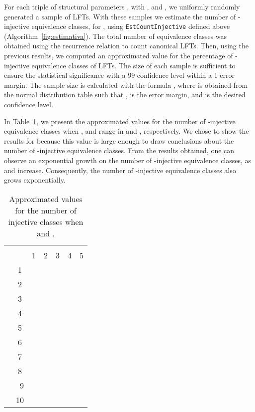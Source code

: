 \documentclass{ocg}
\newcommand{\LFT}{LFT}
\begin{document}
For each triple of structural parameters , with ,  and , we uniformly randomly
generated a sample of  \LFT{}s. With these samples we estimate
the number of -injective equivalence classes, for , using \texttt{EstCountInjective}
defined above (Algorithm~\ref{fig:estimativa}). The total number of
equivalence classes was obtained using the recurrence relation
to count canonical \LFT{}s. Then, using the previous results, we
computed an approximated value for the percentage of -injective
equivalence classes of \LFT{}s. The size of each sample is sufficient
to ensure the statistical significance with a 99 confidence level
within a 1 error margin. The sample size is calculated
with the formula , where  is obtained
from the normal distribution table such that ,  is the error margin, and  is the desired
confidence level.

In Table~\ref{tableIclasses}, we present the approximated values for the
number of -injective equivalence classes when , and 
range in  and , respectively. We
chose to show the results for  because this value is large
enough to draw conclusions about the number of -injective
equivalence classes. From the results obtained, one can observe an
exponential growth on the number of -injective equivalence
classes, as  and  increase. Consequently, the number of
-injective equivalence classes also grows exponentially.

\begin{table}[h]
  \centering\footnotesize \begin{tabular}{|c|c|c|c|c|c|c|}
    \cline{3-7}
    \multicolumn{1}{c}{}&\multicolumn{1}{c}{} & \multicolumn{5}{|c|}{\footnotesize }\\ 
    \cline{3-7} 
    \multicolumn{2}{c|}{}&1&2&3&4&5\\\hline
    \multirow{10}{*}{\footnotesize }&  1
&\scriptsize&\scriptsize&\scriptsize&\scriptsize&\scriptsize\\
    \cline{2-7}
& 2 &\scriptsize&\scriptsize&\scriptsize&\scriptsize&\scriptsize\\
    \cline{2-7}
& 3 &\scriptsize&\scriptsize&\scriptsize&\scriptsize&\scriptsize\\
    \cline{2-7}
& 4 &\scriptsize&\scriptsize&\scriptsize&\scriptsize&\scriptsize\\
    \cline{2-7}
& 5 &\scriptsize&\scriptsize&\scriptsize&\scriptsize&\scriptsize\\
    \cline{2-7}
& 6 &\scriptsize&\scriptsize&\scriptsize&\scriptsize&\scriptsize\\
    \cline{2-7}
& 7 &\scriptsize&\scriptsize&\scriptsize&\scriptsize&\scriptsize\\
    \cline{2-7}
& 8 &\scriptsize&\scriptsize&\scriptsize&\scriptsize&\scriptsize\\
    \cline{2-7}
&\ 9 &\scriptsize&\scriptsize&\scriptsize&\scriptsize&\scriptsize\\
    \cline{2-7}
& 10 &\scriptsize&\scriptsize&\scriptsize&\scriptsize&\scriptsize\\
    \hline
  \end{tabular}
  \caption{Approximated values for the number of injective classes when  and .}
  \label{tableIclasses}
\end{table}
\end{document}
